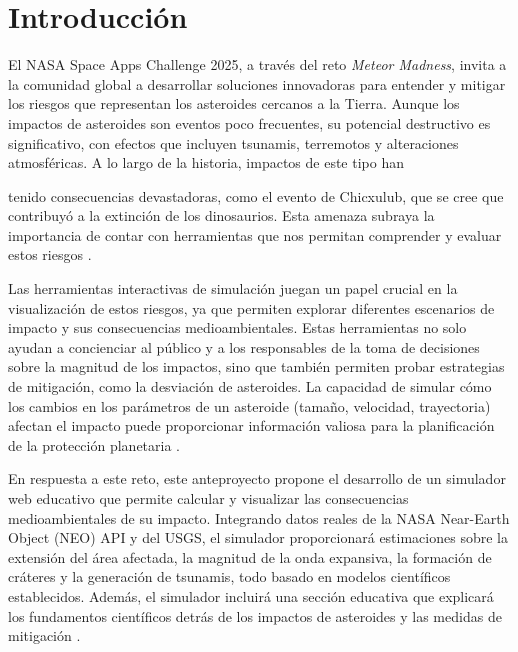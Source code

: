 \documentclass[conference]{IEEEtran}
\begin{document}




%
\IEEEpeerreviewmaketitle

\section{Introducción}

El NASA Space Apps Challenge 2025, a través del reto \textit{Meteor Madness},
invita a la comunidad global a desarrollar soluciones innovadoras para entender
y mitigar los riesgos que representan los asteroides cercanos a la Tierra.
Aunque los impactos de asteroides son eventos poco frecuentes, su potencial
destructivo es significativo, con efectos que incluyen tsunamis, terremotos y
alteraciones atmosféricas. A lo largo de la historia, impactos de este tipo han

tenido consecuencias devastadoras, como el evento de Chicxulub, que se cree que
contribuyó a la extinción de los dinosaurios. Esta amenaza subraya la
importancia de contar con herramientas que nos permitan comprender y evaluar
estos riesgos \cite{ward2000,melosh1989}.

Las herramientas interactivas de simulación juegan un papel crucial en la visualización de estos riesgos, ya que permiten explorar diferentes escenarios de impacto y sus consecuencias medioambientales. Estas herramientas no solo ayudan a concienciar al público y a los responsables de la toma de decisiones sobre la magnitud de los impactos, sino que también permiten probar estrategias de mitigación, como la desviación de asteroides. La capacidad de simular cómo los cambios en los parámetros de un asteroide (tamaño, velocidad, trayectoria) afectan el impacto puede proporcionar información valiosa para la planificación de la protección planetaria \cite{collins2005}.

En respuesta a este reto, este anteproyecto propone el desarrollo de un simulador web educativo que permite calcular y visualizar las consecuencias medioambientales de su impacto. Integrando datos reales de la NASA Near-Earth Object (NEO) API y del USGS, el simulador proporcionará estimaciones sobre la extensión del área afectada, la magnitud de la onda expansiva, la formación de cráteres y la generación de tsunamis, todo basado en modelos científicos establecidos. Además, el simulador incluirá una sección educativa que explicará los fundamentos científicos detrás de los impactos de asteroides y las medidas de mitigación \cite{collins2005,wuennemann2010}.
\end{document}
